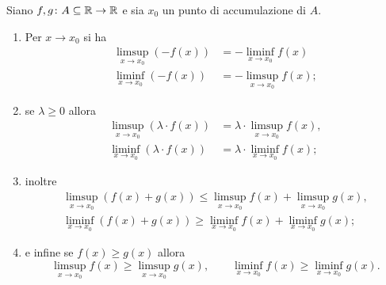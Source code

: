 \begin{theorem}
Siano $f,g\colon A\subseteq \mathbb R\to\mathbb R$ e sia $x_0$ un punto di accumulazione di $A$. 
\begin{enumerate}
  \item 
    Per $x\to x_0$ si ha 
    \begin{align*}
    \limsup_{x\to x_0} (-f(x)) &= -\liminf_{x\to x_0} f(x)\\ 
    \liminf_{x\to x_0} (-f(x)) &= -\limsup_{x\to x_0} f(x);
    \end{align*}
  \item
    se $\lambda \ge 0$ allora
      \begin{align*}
      \limsup_{x\to x_0} (\lambda \cdot f(x)) &= \lambda \cdot \limsup_{x\to x_0} f(x), \\
      \liminf_{x\to x_0} (\lambda \cdot f(x)) &= \lambda \cdot \liminf_{x\to x_0} f(x);
      \end{align*}
  \item
  inoltre
  \begin{gather*}
  \limsup_{x\to x_0} (f(x) + g(x)) \le \limsup_{x\to x_0} f(x) + \limsup_{x\to x_0} g(x),\\
  \liminf_{x\to x_0} (f(x) + g(x)) \ge \liminf_{x\to x_0} f(x) + \liminf_{x\to x_0} g(x);
  \end{gather*}
  \item
  e infine se $f(x) \ge g(x)$ allora
  \[
   \limsup_{x\to x_0} f(x) \ge \limsup_{x\to x_0} g(x), \qquad \liminf_{x\to x_0} f(x) \ge \liminf_{x\to x_0} g(x).
  \]
\end{enumerate}
\end{theorem}
%
